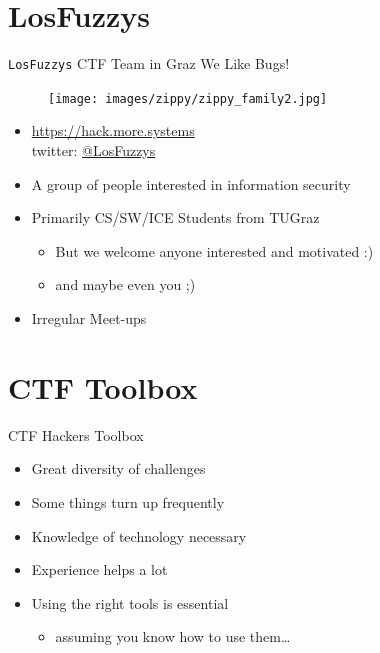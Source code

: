 \section{LosFuzzys}

\begin{frame}[allowframebreaks]
  {\texttt{LosFuzzys} CTF Team in Graz}
  {We Like Bugs!}

  \begin{figure}[H]
    \centering
    \texttt{[image: images/zippy/zippy\_family2.jpg]}
  \end{figure}

  \framebreak

  \begin{itemize}
    \item \url{https://hack.more.systems}
      \\ twitter: \href{https://twitter.com/LosFuzzys}{@LosFuzzys}
    \item A group of people interested in information security
    \item Primarily CS/SW/ICE Students from TUGraz
      \begin{itemize}
        \item But we welcome anyone interested and motivated :)
        \item and maybe even you ;)
      \end{itemize}
    \item Irregular Meet-ups
  \end{itemize}
\end{frame}

\section{CTF Toolbox}

\begin{frame}
  {CTF Hackers Toolbox}

  \begin{itemize}
    \item Great diversity of challenges
    \item Some things turn up frequently
    \item Knowledge of technology necessary
    \item Experience helps a lot
  \end{itemize}

  \begin{itemize}
    \item Using the right tools is essential
      \begin{itemize}
        \item assuming you know how to use them\ldots
      \end{itemize}
  \end{itemize}

\end{frame}

